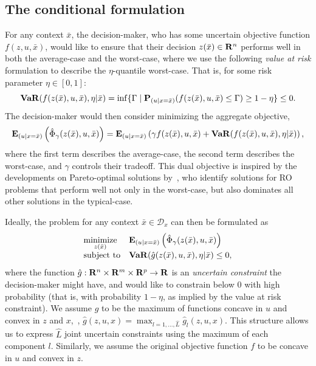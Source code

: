 \documentclass[11pt]{article}
\begin{document}
\subsection{The conditional formulation}
\label{sec:cond}
For any context $\bar{x}$, the decision-maker, who has some uncertain objective function $f(z,u,\bar{x})$, would like to ensure that their decision $z(\bar{x}) \in {\mathbf R}^n$ performs well in both the average-case and the worst-case, where we use the following {\it value at risk} formulation to describe the $\eta$-quantile worst-case. That is, for some risk parameter $\eta \in [0,1]$:
\begin{equation*}
\mathop{\bf VaR}(f(z(\bar{x}),u,\bar{x}),\eta|\bar{x}) = \inf\{\Gamma \mid {\mathbf P}_{(u|x = \bar{x})}(f(z(\bar{x}),u,\bar{x}) \leq \Gamma) \geq 1-\eta\} \leq 0.
\end{equation*} 
The decision-maker would then consider minimizing the aggregate objective,
\begin{equation}
	\label{eq:performance_metric}
	\mathbf{E}_{(u|x = \bar{x})}\left(\hat{\Phi}_\gamma(z(\bar{x}),u,\bar{x})\right) = \mathbf{E}_{(u|x = \bar{x})}\left(\gamma f(z(\bar{x}),u,\bar{x}) + \mathop{\bf VaR}(f(z(\bar{x}),u,\bar{x}),\eta|\bar{x}) \right),
\end{equation} 
where the first term describes the average-case, the second term describes the worst-case, and $\gamma$ controls their tradeoff. This dual objective is inspired by the developments on Pareto-optimal solutions by~\cite{pareto}, who identify solutions for \gls{RO} problems that perform well not only in the worst-case, but also dominates all other solutions in the typical-case. 

Ideally, the problem for any context $\bar{x} \in \mathcal{D}_x$ can then be formulated as
\begin{equation}
	\label{eq:bilevel_intro_opt_cond}
	\begin{array}{ll}
		\underset{z(\bar{x})}{\mbox{minimize}} & \mathbf{E}_{(u|x = \bar{x})}\left(\hat{\Phi}_\gamma(z(\bar{x}),u,\bar{x})\right) \\
		\mbox{subject to} & \mathop{\bf VaR}(\hat{g}(z(\bar{x}),u,\bar{x}),\eta|\bar{x}) \leq 0,\\
	\end{array}
\end{equation}
where the function $\hat{g} : {\mathbf R}^n \times {\mathbf R}^m \times {\mathbf R}^{p} \to {\mathbf R}$  is an {\it uncertain constraint} the decision-maker might have, and would like to constrain below 0 with high probability (that is, with probability $1-\eta$, as implied by the value at risk constraint). We assume $\hat{g}$ to be the maximum of functions concave in $u$ and convex in $z$ and $x$,~\eg, $\hat{g}(z, u, x) = \max_{l=1,\dots, \hat{L}} \hat{g}_l(z, u, x)$. This structure allows us to express $\hat{L}$ joint uncertain constraints using the maximum of each component $l$. Similarly, we assume the original objective function $f$ to be concave in $u$ and convex in $z$. 
\end{document}
